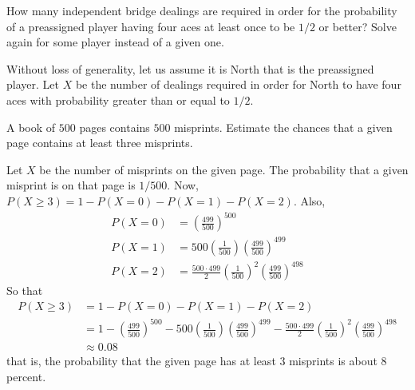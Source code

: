 \begin{problem}[Handout 8, \# 12]
  How many independent bridge dealings are required in order for the
  probability of a preassigned player having four aces at least once to be
  \(1/2\) or better? Solve again for some player instead of a given one.
\end{problem}
\begin{solution}
  Without loss of generality, let us assume it is North that is the
  preassigned player. Let \(X\) be the number of dealings required in order
  for North to have four aces with probability greater than or equal to
  \(1/2\).
\end{solution}
\newpage
\begin{problem}[Handout 8, \# 13]
  A book of \(500\) pages contains \(500\) misprints. Estimate the chances
  that a given page contains at least three misprints.
\end{problem}
\begin{solution}
  Let $X$ be the number of misprints on the given page. The probability
  that a given misprint is on that page is $1/500$. Now,
  $P(X \geq 3) = 1- P(X=0) - P(X=1) - P(X=2)$. Also,
  \begin{align*}
    P(X=0) &= \left(\frac{499}{500}\right)^{500}\\
    P(X=1) &= 500\left(\frac{1}{500}\right)\left(\frac{499}{500}\right)^{499} \\
    P(X=2) &= \frac{500 \cdot 499}{2}\left(\frac{1}{500}\right)^2\left(\frac{499}{500}\right)^{498}
  \end{align*}
  So that
  \begin{align*}
    P(X \geq 3) &= 1- P(X=0) - P(X=1) - P(X=2)\\
                &= 1- \left(\frac{499}{500}\right)^{500} - 500\left(\frac{1}{500}\right)\left(\frac{499}{500}\right)^{499} - \frac{500 \cdot 499}{2}\left(\frac{1}{500}\right)^2\left(\frac{499}{500}\right)^{498}\\
                &\approx 0.08
  \end{align*}
  that is, the probability that the given page has at least \(3\) misprints
  is about \(8\) percent.
\end{solution}

\newpage

